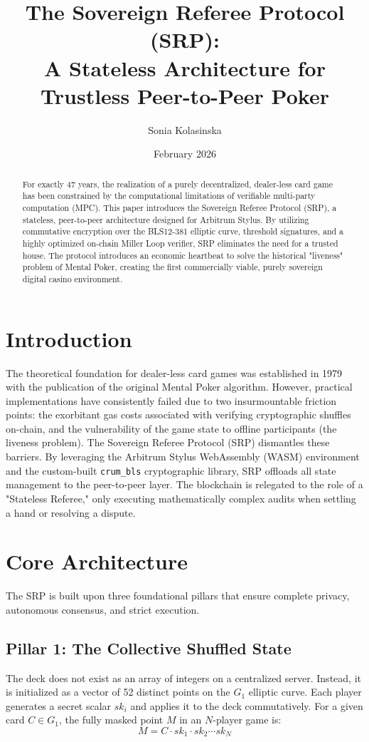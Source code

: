 \documentclass[11pt, a4paper]{article}
\title{\textbf{The Sovereign Referee Protocol (SRP): \\ A Stateless Architecture for Trustless Peer-to-Peer Poker}}
\author{Sonia Kolasinska}
\date{February 2026}
\begin{document}
\maketitle

\begin{abstract}
For exactly 47 years, the realization of a purely decentralized, dealer-less card game has been constrained by the computational limitations of verifiable multi-party computation (MPC).
This paper introduces the Sovereign Referee Protocol (SRP), a stateless, peer-to-peer architecture designed for Arbitrum Stylus.
By utilizing commutative encryption over the BLS12-381 elliptic curve, threshold signatures, and a highly optimized on-chain Miller Loop verifier, SRP eliminates the need for a trusted house.
The protocol introduces an economic heartbeat to solve the historical "liveness" problem of Mental Poker, creating the first commercially viable, purely sovereign digital casino environment.
\end{abstract}

\section{Introduction}
The theoretical foundation for dealer-less card games was established in 1979 with the publication of the original Mental Poker algorithm.
However, practical implementations have consistently failed due to two insurmountable friction points: the exorbitant gas costs associated with verifying cryptographic shuffles on-chain, and the vulnerability of the game state to offline participants (the liveness problem).
The Sovereign Referee Protocol (SRP) dismantles these barriers. By leveraging the Arbitrum Stylus WebAssembly (WASM) environment and the custom-built \texttt{crum\_bls} cryptographic library, SRP offloads all state management to the peer-to-peer layer.
The blockchain is relegated to the role of a "Stateless Referee," only executing mathematically complex audits when settling a hand or resolving a dispute.

\section{Core Architecture}
The SRP is built upon three foundational pillars that ensure complete privacy, autonomous consensus, and strict execution.

\subsection{Pillar 1: The Collective Shuffled State}
The deck does not exist as an array of integers on a centralized server.
Instead, it is initialized as a vector of 52 distinct points on the $G_1$ elliptic curve.
Each player generates a secret scalar $sk_i$ and applies it to the deck commutatively.
For a given card $C \in G_1$, the fully masked point $M$ in an $N$-player game is:
$$M = C \cdot sk_1 \cdot sk_2 \cdots sk_N$$
\end{document}
